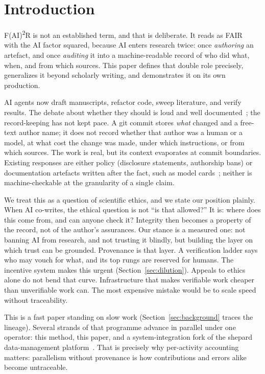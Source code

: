 \section{Introduction}\label{sec:intro}

F(AI)\textsuperscript{2}R is not an established term, and that is
deliberate. It reads as FAIR~\cite{fair2016} with the AI factor
squared, because AI enters research twice: once \emph{authoring} an
artefact, and once \emph{auditing} it into a machine-readable record
of who did what, when, and from which sources. This paper defines that
double role precisely, generalizes it beyond scholarly writing, and
demonstrates it on its own production.

AI agents now draft manuscripts, refactor code, sweep literature, and
verify results. The debate about whether they should is loud and
well documented~\cite{chatgpt-wrote-it2023, chatgpt-priorities2023};
the record-keeping has not kept pace. A git commit stores \emph{what}
changed and a free-text author name; it does not record whether that
author was a human or a model, at what cost the change was made, under
which instructions, or from which sources. The work is real, but its
context evaporates at commit boundaries. Existing responses are either
policy (disclosure statements, authorship bans) or documentation
artefacts written after the fact, such as model
cards~\cite{modelcards2019}; neither is machine-checkable at the
granularity of a single claim.

We treat this as a question of scientific ethics, and we state our
position plainly. When AI co-writes, the ethical question is not
``is that allowed?'' It is: where does this come from, and can anyone
check it? Integrity then becomes a property of the record, not of the
author's assurances. Our stance is a measured one: not banning AI from
research, and not trusting it blindly, but building the layer on which
trust can be grounded. Provenance is that layer. A verification ladder
says who may vouch for what, and its top rungs are reserved for
humans. The incentive system makes this urgent
(Section~\ref{sec:dilution}). Appeals
to ethics alone do not bend that curve. Infrastructure that makes
verifiable work cheaper than unverifiable work can. The most expensive
mistake would be to scale speed without traceability.

This is a fast paper standing on slow work
(Section~\ref{sec:background} traces the lineage). Several strands of that programme
advance in parallel under one operator: this method, this paper, and a
system-integration fork of the shepard data-management
platform~\cite{shepard-fork}. That is precisely why per-activity
accounting matters: parallelism without provenance is how
contributions and errors alike become untraceable.

